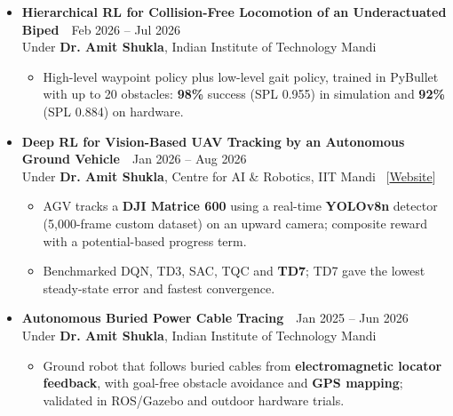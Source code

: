 \documentclass[letterpaper,10pt]{article}
\newcommand{\project}[3]{%
  \item[]\textbf{#1}\ \ {\small #2}\\
  {\small #3}\vspace{-4pt}}
\newenvironment{bullets}{\begin{itemize}[label=\textbullet]\small}{\end{itemize}\vspace{-2pt}}
\newenvironment{entries}{\begin{itemize}[leftmargin=0in, label={}, itemsep=6pt]}{\end{itemize}}
\begin{document}
\begin{entries}
  \project{Hierarchical RL for Collision-Free Locomotion of an Underactuated Biped}{Feb 2026 -- Jul 2026}
          {Under \textbf{Dr. Amit Shukla}, Indian Institute of Technology Mandi}
  \begin{bullets}
    \item High-level waypoint policy plus low-level gait policy, trained in PyBullet with up to 20 obstacles: \textbf{98\%} success (SPL 0.955) in simulation and \textbf{92\%} (SPL 0.884) on hardware.
  \end{bullets}

  \project{Deep RL for Vision-Based UAV Tracking by an Autonomous Ground Vehicle}{Jan 2026 -- Aug 2026}
          {Under \textbf{Dr. Amit Shukla}, Centre for AI \& Robotics, IIT Mandi \ [\href{https://microgridx.github.io/UAV-AGV_Collaboration_website/}{Website}]}
  \begin{bullets}
    \item AGV tracks a \textbf{DJI Matrice 600} using a real-time \textbf{YOLOv8n} detector (5,000-frame custom dataset) on an upward camera; composite reward with a potential-based progress term.
    \item Benchmarked DQN, TD3, SAC, TQC and \textbf{TD7}; TD7 gave the lowest steady-state error and fastest convergence.
  \end{bullets}

  \project{Autonomous Buried Power Cable Tracing}{Jan 2025 -- Jun 2026}
          {Under \textbf{Dr. Amit Shukla}, Indian Institute of Technology Mandi}
  \begin{bullets}
    \item Ground robot that follows buried cables from \textbf{electromagnetic locator feedback}, with goal-free obstacle avoidance and \textbf{GPS mapping}; validated in ROS/Gazebo and outdoor hardware trials.
  \end{bullets}
\end{entries}

\end{document}
